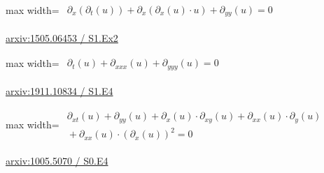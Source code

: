 \documentclass[UTF8,10pt,a4paper,fontset=mac]{ctexart}
\begin{document}
\begin{minipage}{\linewidth}\begin{center}\begin{adjustbox}{max width=\linewidth}$\displaystyle\begin{gathered}\begin{gathered}\partial_{x}(\partial_{t}(u))+\partial_{x}(\partial_{x}(u)\cdot u)+\partial_{yy}(u)=0\end{gathered}\end{gathered}$\end{adjustbox}\end{center}{\small\href{https://arxiv.org/html/1505.06453#S1.Ex2}{arxiv:1505.06453 / S1.Ex2}}\par\end{minipage}\par\vspace{6mm}

\begin{minipage}{\linewidth}\begin{center}\begin{adjustbox}{max width=\linewidth}$\displaystyle\begin{gathered}\begin{gathered}\partial_{t}(u)+\partial_{xxx}(u)+\partial_{yyy}(u)=0\end{gathered}\end{gathered}$\end{adjustbox}\end{center}{\small\href{https://arxiv.org/html/1911.10834#S1.E4}{arxiv:1911.10834 / S1.E4}}\par\end{minipage}\par\vspace{6mm}

\begin{minipage}{\linewidth}\begin{center}\begin{adjustbox}{max width=\linewidth}$\displaystyle\begin{gathered}\begin{gathered}\partial_{xt}(u)+\partial_{yy}(u)+\partial_{x}(u)\cdot \partial_{xy}(u)+\partial_{xx}(u)\cdot \partial_{y}(u)\\[-1pt]{}+\partial_{xx}(u)\cdot (\partial_{x}(u))^{2}=0\end{gathered}\end{gathered}$\end{adjustbox}\end{center}{\small\href{https://arxiv.org/html/1005.5070#S0.E4}{arxiv:1005.5070 / S0.E4}}\par\end{minipage}\par\vspace{6mm}
\end{document}
